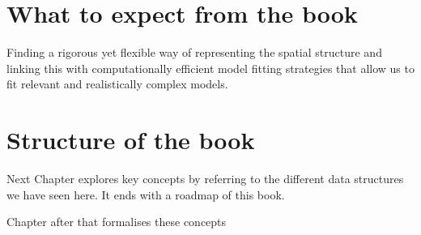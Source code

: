 \documentclass[authoryear]{book}
\theoremstyle{definition}
\begin{document}
\section{What to expect from the book}


Finding a rigorous yet flexible way of representing the spatial structure and linking this with computationally efficient model fitting strategies that allow us to fit relevant and realistically complex models.

\section{Structure of the book}

Next Chapter explores key concepts by referring to the different data structures we have seen here. It ends with a roadmap of this book.
 
Chapter after that formalises these concepts
\printindex
\end{document}
